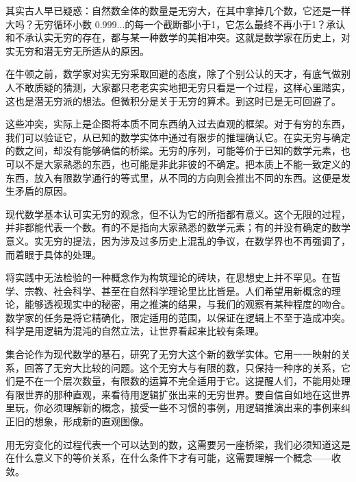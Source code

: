 其实古人早已疑惑：自然数全体的数量是无穷大，在其中拿掉几个数，它还是一样大吗？无穷循环小数 $ 0.999... $的每一个截断都小于1，它怎么最终不再小于1？承认和不承认实无穷的存在，都与某一种数学的美相冲突。这就是数学家在历史上，对实无穷和潜无穷无所适从的原因。

在牛顿之前，数学家对实无穷采取回避的态度，除了个别公认的天才，有底气做别人不敢质疑的猜测，大家都只老老实实地把无穷只看是一个过程，这样心里踏实，这也是潜无穷派的想法。但微积分是关于无穷的算术。到这时已是无可回避了。

这些冲突，实际上是企图将本质不同东西纳入过去直观的框架。对于有穷的东西，我们可以验证它，从已知的数学实体中通过有限步的推理确认它。在实无穷与确定的数之间，却没有能够确信的桥梁。无穷的序列，可能等价于已知的数学元素，也可以不是大家熟悉的东西，也可能是非此非彼的不确定。把本质上不能一致定义的东西，放入有限数学通行的等式里，从不同的方向则会推出不同的东西。这便是发生矛盾的原因。

现代数学基本认可实无穷的观念，但不认为它的所指都有意义。这个无限的过程，并非都能代表一个数。有的不是指向大家熟悉的数学元素；有的并没有确定的数学意义。实无穷的提法，因为涉及过多历史上混乱的争议，在数学界也不再强调了，而着眼于具体的处理。

将实践中无法检验的一种概念作为构筑理论的砖块，在思想史上并不罕见。在哲学、宗教、社会科学、甚至在自然科学理论里比比皆是。人们希望用新概念的理论，能够透视现实中的秘密，用之推演的结果，与我们的观察有某种程度的吻合。数学家的任务是将它精确化，限定适用的范围，以保证在逻辑上不至于造成冲突。科学是用逻辑为混沌的自然立法，让世界看起来比较有条理。

集合论作为现代数学的基石，研究了无穷大这个新的数学实体。它用一一映射的关系，回答了无穷大比较的问题。这个无穷大与有限的数，只保持一种序的关系，它们是不在一个层次数量，有限数的运算不完全适用于它。这提醒人们，不能用处理有限世界的那种直观，来看待用逻辑扩张出来的无穷世界。要自信自如地在这世界里玩，你必须理解新的概念，接受一些不习惯的事例，用逻辑推演出来的事例来纠正旧的想象，形成新的直观图像。

用无穷变化的过程代表一个可以达到的数，这需要另一座桥梁，我们必须知道这是在什么意义下的等价关系，在什么条件下才有可能，这需要理解一个概念——收敛。